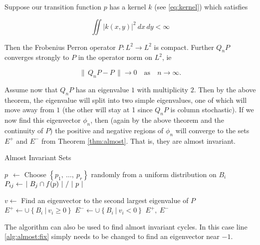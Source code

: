 \begin{theorem}
    \label{thm:QnP}
    \cite*{attr}
    Suppose our transition function $p$ has a kernel $k$ (see \autoref{eq:kernel}) which 
    satisfies 

    \begin{equation}
        \iint |k(x, y)|^2\ dx\,dy < \infty
    \end{equation}

    Then the Frobenius Perron operator $P : L^2 \to L^2$ is compact. Further $Q_n P$ 
    converges strongly to $P$ in the operator norm on $L^2$, ie

    \begin{equation}
        \|\, Q_n P - P \,\| \to 0 \quad \text{as} \quad n \to \infty .
    \end{equation}

\end{theorem}

Assume now that $Q_n P$ has an eigenvalue $1$ with multiplicity $2$. Then by the above 
theorem, the eigenvalue will split into two simple eigenvalues, one of which will move away  
from $1$ (the other will stay at 1 since $Q_n P$ is column stochastic). If we now find 
this eigenvector $\phi_n$, then (again by the above theorem and the continuity of $P$) 
the positive and negative regions of $\phi_n$ will converge to the sets $E^+$ and $E^-$ 
from Theorem \ref{thm:almost}. That is, they are almost invariant. 

\begin{algorithm}
    \caption{Almost Invariant Sets}
    \label{alg:almost}
    \begin{spacing}{1.2}
        \begin{algorithmic}[1]

                \State $p\ \ \gets $ Choose $\left\{ p_1,\ \ldots,\ p_r \right\}$ randomly from a uniform distribution on $B_i$
                \State $P_{ij} \gets \left. |\ B_j \cap f(p)\ | \ \middle/\ |\ p\ | \right.$
            \EndFor
    
            \State $v \gets $ Find an eigenvector to the second largest eigenvalue of $P$
            \label{alg:almost:fix}
            \State $E^+ \gets \cup \left\{ B_i\ \vert\ v_i \geq 0 \right\}$
            \State $E^- \gets \cup \left\{ B_i\ \vert\ v_i < 0 \right\}$
            \State \Return $E^+,\ E^-$
        \end{algorithmic}
    \end{spacing}
\end{algorithm}

\begin{remark}
    The algorithm can also be used to find almost invariant cycles. In this case line 
    \ref{alg:almost:fix} simply needs to be changed to find an eigenvector near $-1$.
\end{remark} 

